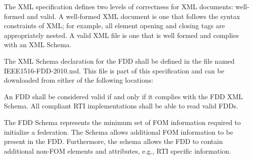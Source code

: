 
\clearpage

\begin{annexstdpage}

    The XML specification defines two levels of correctness for XML documents: well-formed and valid. A well-formed XML document is one that follows the syntax constraints of XML; for example, all element opening and closing tags are appropriately nested. A valid XML file is one that is well formed and complies with an XML Schema.

    The XML Schema declaration for the FDD shall be defined in the file named IEEE1516-FDD-2010.xsd. This file is part of this specification and can be downloaded from either of the following locations:

    \begin{stddashlist}
        \item {}
        \item {}
    \end{stddashlist}

    An FDD shall be considered valid if and only if it complies with the FDD XML Schema. All compliant RTI implementations shall be able to read valid FDDs.

    The FDD Schema represents the minimum set of FOM information required to initialize a federation. The Schema allows additional FOM information to be present in the FDD. Furthermore, the schema allows the FDD to contain additional non-FOM elements and attributes, e.g., RTI specific information.
\end{annexstdpage}

\clearpage

\thispagestyle{body}
\null

